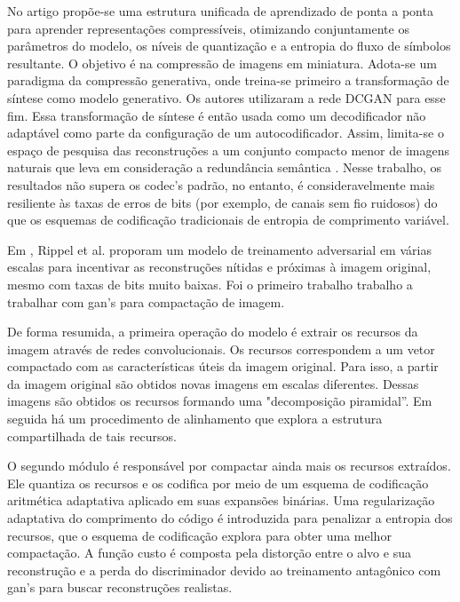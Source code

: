 


No artigo \cite{santurkar2018generative} propõe-se uma estrutura unificada de aprendizado de ponta a ponta para aprender representações compressíveis, otimizando conjuntamente os parâmetros do modelo, os níveis de quantização e a entropia do fluxo de símbolos resultante. O objetivo é na compressão de imagens em miniatura.
Adota-se um paradigma da compressão generativa, onde treina-se primeiro a transformação de síntese como modelo generativo. Os autores utilizaram a rede DCGAN \cite{radford2015unsupervised} para esse fim. Essa transformação de síntese é então usada como um decodificador não adaptável como parte da configuração de um autocodificador. Assim, limita-se o espaço de pesquisa das reconstruções a um conjunto compacto menor de imagens naturais que leva em consideração a redundância semântica \cite{santurkar2018generative}. 
Nesse trabalho, os resultados não supera os \acrshort{codec}'s padrão, no entanto, é consideravelmente mais resiliente às taxas de erros de bits (por exemplo, de canais sem fio ruidosos) do que os esquemas de codificação tradicionais de entropia de comprimento variável.


Em \cite{GAN2017Rippel}, Rippel et al. proporam um modelo de treinamento adversarial em várias escalas para incentivar as reconstruções nítidas e próximas à imagem original, mesmo com taxas de bits muito baixas. Foi o primeiro trabalho trabalho a trabalhar com \acrshort{gan}'s para compactação de imagem. 

De forma resumida, a primeira operação do modelo é extrair os recursos da imagem através de redes convolucionais. Os recursos correspondem a um vetor compactado com as características úteis da imagem original. Para isso, a partir da imagem original são obtidos novas imagens em escalas diferentes. Dessas imagens são obtidos os recursos formando uma  "decomposição piramidal''. Em seguida há um procedimento de alinhamento que explora a estrutura compartilhada de tais recursos.  

O segundo módulo é responsável por compactar ainda mais os recursos extraídos. Ele quantiza os recursos e os codifica por meio de um esquema de codificação aritmética adaptativa aplicado em suas expansões binárias. Uma regularização adaptativa do comprimento do código é introduzida para penalizar a entropia dos recursos, que o esquema de codificação explora para obter uma melhor compactação. 
A função custo é composta pela distorção entre o alvo e sua reconstrução e a perda do discriminador devido ao treinamento antagônico com \acrshort{gan}'s para buscar reconstruções realistas.


